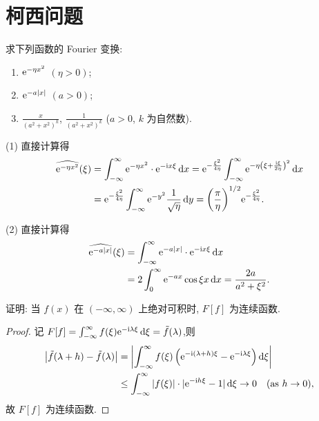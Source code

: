 \section{柯西问题}

\begin{exercise}
  求下列函数的 Fourier 变换:
  \begin{enumerate}[(1),left=\parindent]
    \item $\mathrm{e}^{-\eta x^2}$ $(\eta>0)$;
    \item $\mathrm{e}^{-a|x|}$ $(a>0)$;
    \item $\frac{x}{(a^2+x^2)^k}$, $\frac{1}{(a^2+x^2)^k}$ ($a>0$, $k$ 为自然数).
  \end{enumerate}
\end{exercise}

\begin{solution}
  (1) 直接计算得
  \begin{align*}
    \widehat{\mathrm{e}^{-\eta x^2}}(\xi)
    & = \int_{-\infty}^{\infty} \mathrm{e}^{-\eta x^2}\cdot \mathrm{e}^{-\mathrm{i} x\xi}\mathop{}\!\mathrm{d} x
      = \mathrm{e}^{-\frac{\xi^2}{4\eta}} \int_{-\infty}^{\infty}
      \mathrm{e}^{-\eta\left(\xi+\frac{\mathrm{i}\xi}{2\eta}\right)^2} \mathop{}\!\mathrm{d} x \\
    & = \mathrm{e}^{-\frac{\xi^2}{4\eta}} \int_{-\infty}^{\infty}
      \mathrm{e}^{-y^2} \frac{1}{\sqrt{\eta}} \mathop{}\!\mathrm{d} y
      = \biggl(\frac{\pi}{\eta}\biggr)^{1/2} \mathrm{e}^{-\frac{\xi^2}{4\eta}}.
    \end{align*}

  (2) 直接计算得
  \begin{align*}
    \widehat{\mathrm{e}^{-a|x|}} (\xi)
    & = \int_{-\infty}^{\infty} \mathrm{e}^{-a|x|}\cdot\mathrm{e}^{-\mathrm{i} x\xi} \mathop{}\!\mathrm{d} x \\
    & = 2\int_0^{\infty} \mathrm{e}^{-ax} \cos\xi x \mathop{}\!\mathrm{d} x = \frac{2a}{a^2+\xi^2}.
  \end{align*}
\end{solution}


\begin{exercise}
  证明: 当 $f(x)$ 在 $(-\infty,\infty)$ 上绝对可积时, $F[f]$ 为连续函数.
\end{exercise}

\begin{proof}
  记 $F[f]=\int_{-\infty}^{\infty} f(\xi)\mathrm{e}^{-\mathrm{i}\lambda\xi}\mathop{}\!\mathrm{d}\xi = \tilde{f}(\lambda)$,则
  \[\begin{split}
    \bigl|\tilde{f}(\lambda+h)-\tilde{f}(\lambda)\bigr|
    & = \left|\int_{-\infty}^{\infty}f(\xi)
        \left(\mathrm{e}^{-\mathrm{i}(\lambda+h)\xi} - \mathrm{e}^{-\mathrm{i}\lambda\xi}\right)\mathop{}\!\mathrm{d}\xi\right| \\
    & \leq \int_{-\infty}^{\infty}|f(\xi)|\cdot|\mathrm{e}^{-\mathrm{i} h\xi}-1|\mathop{}\!\mathrm{d}\xi\to 0
      \quad(\text{as } h\to 0),
  \end{split}\]
  故 $F[f]$ 为连续函数.
\end{proof}


